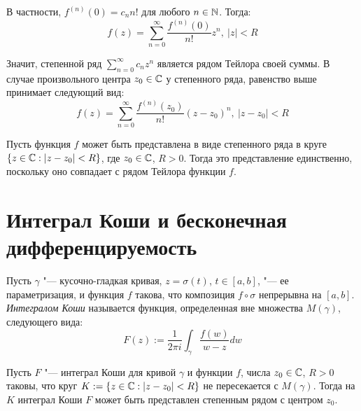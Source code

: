 \begin{note}
	В частности, $f^{(n)}(0) =c_nn!$ для любого $n \in \mathbb{N}$. Тогда:
	\[f(z) = \sum_{n=0}^\infty \frac{f^{(n)}(0)}{n!}z^n,~|z| < R\]
	
	Значит, степенной ряд $\sum_{n=0}^\infty c_nz^n$ является рядом Тейлора своей суммы. В случае произвольного центра $z_0 \in \mathbb{C}$ у степенного ряда, равенство выше принимает следующий вид:
	\[f(z) = \sum_{n=0}^\infty \frac{f^{(n)}(z_0)}{n!}(z - z_0)^n,~|z - z_0| < R\]
\end{note}

\begin{note}
	Пусть функция $f$ может быть представлена в виде степенного ряда в круге $\{z \in \mathbb{C} : |z - z_0| < R\}$, где $z_0 \in \mathbb{C}$, $R > 0$. Тогда это представление единственно, поскольку оно совпадает с рядом Тейлора функции $f$.
\end{note}

\section{Интеграл Коши и бесконечная дифференцируемость}

\begin{definition}
	Пусть $\gamma$ "--- кусочно-гладкая кривая, $z = \sigma(t)$, $t \in [a, b]$, "--- ее параметризация, и функция $f$ такова, что композиция $f\circ\sigma$ непрерывна на $[a, b]$. \textit{Интегралом Коши} называется функция, определенная вне множества $M(\gamma)$, следующего вида:
	\[F(z) := \frac1{2\pi i}\int_\gamma \frac{f(w)}{w - z}dw\]
\end{definition}

\begin{theorem}
	Пусть $F$ "--- интеграл Коши для кривой $\gamma$ и функции $f$, числа $z_0 \in \mathbb{C}$, $R > 0$ таковы, что круг $K := \{z \in \mathbb{C}: |z - z_0| < R\}$ не пересекается с $M(\gamma)$. Тогда на $K$ интеграл Коши $F$ может быть представлен степенным рядом с центром $z_0$.
\end{theorem}

